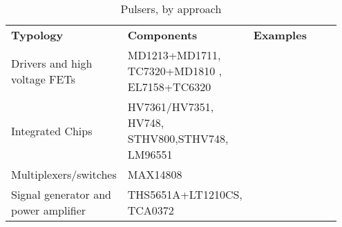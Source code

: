

\begin{table}[h!]
\begin{tabular}{p{0.2\linewidth} | p{0.3\linewidth} | p{0.45\linewidth} }%
\textbf{Typology}                    & \textbf{Components}          & \textbf{Examples} \\

Drivers and high voltage FETs  
& MD1213+MD1711, TC7320+MD1810 , EL7158+TC6320
& \cite{sharma_development_2015,wu_novel_2013,ching_chu_designing_nodate}                 \\

Integrated Chips 
& HV7361/HV7351, HV748, STHV800,STHV748, LM96551
& \cite{martins_-scan_2017,zhang_multi-channel_2017,hewener_highly_2012,worthing_using_2016,joseph_artsenstouch_2015}                 \\

Multiplexers/switches 
& MAX14808
& \cite{rodriguez-olivares_improvement_2018,lee_new_2014,garcia_piezoelectric_2014,boni_ula-op_2016} \\

Signal generator and power amplifier 
& THS5651A+LT1210CS, TCA0372
& \cite{matera_smart_2018,choi_versatile_2020}
\end{tabular}
\caption{Pulsers, by approach}
\label{tab:pulser}
\end{table}
